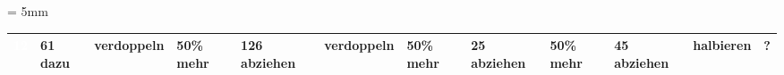 \documentclass[a4paper]{scrartcl}
\begin{document}
\tabulinesep = 5mm

\begin{tabu} {|X[m,c]|X[m,c]|X[m,c]|X[m,c]|X[m,c]|X[m,c]|X[m,c]|X[m,c]|X[m,c]|X[m,c]|X[m,c]|X[m,c]|}
\hline
{}\textcolor{white}{\Large{\textbf{{12}}}}& 61 dazu& verdoppeln& 50\% mehr& 126 abziehen& verdoppeln& 50\% mehr& 25 abziehen& 50\% mehr& 45 abziehen& halbieren& ? \\
\hline

\end{tabu}
\end{document}
